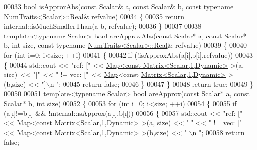 \begin{DoxyCode}
00033 \textcolor{keywordtype}{bool} isApproxAbs(\textcolor{keyword}{const} Scalar& a, \textcolor{keyword}{const} Scalar& b, \textcolor{keyword}{const} \textcolor{keyword}{typename} 
      \hyperlink{group___core___module_struct_eigen_1_1_num_traits}{NumTraits<Scalar>::Real}& refvalue)
00034 \{
00035   \textcolor{keywordflow}{return} internal::isMuchSmallerThan(a-b, refvalue);
00036 \}
00037 
00038 \textcolor{keyword}{template}<\textcolor{keyword}{typename} Scalar> \textcolor{keywordtype}{bool} areApproxAbs(\textcolor{keyword}{const} Scalar* a, \textcolor{keyword}{const} Scalar* b, \textcolor{keywordtype}{int} size, \textcolor{keyword}{const} \textcolor{keyword}{typename} 
      \hyperlink{group___core___module_struct_eigen_1_1_num_traits}{NumTraits<Scalar>::Real}& refvalue)
00039 \{
00040   \textcolor{keywordflow}{for} (\textcolor{keywordtype}{int} i=0; i<size; ++i)
00041   \{
00042     \textcolor{keywordflow}{if} (!isApproxAbs(a[i],b[i],refvalue))
00043     \{
00044       std::cout << \textcolor{stringliteral}{"ref: ["} << \hyperlink{group___core___module_class_eigen_1_1_map}{Map<const Matrix<Scalar,1,Dynamic>} >(a,
      size) << \textcolor{stringliteral}{"]"} << \textcolor{stringliteral}{" != vec: ["} << \hyperlink{group___core___module_class_eigen_1_1_map}{Map}<\textcolor{keyword}{const} \hyperlink{group___core___module_class_eigen_1_1_matrix}{Matrix<Scalar,1,Dynamic>} >(b,size) << \textcolor{stringliteral}{"]\(\backslash\)n
      "};
00045       \textcolor{keywordflow}{return} \textcolor{keyword}{false};
00046     \}
00047   \}
00048   \textcolor{keywordflow}{return} \textcolor{keyword}{true};
00049 \}
00050 
00051 \textcolor{keyword}{template}<\textcolor{keyword}{typename} Scalar> \textcolor{keywordtype}{bool} areApprox(\textcolor{keyword}{const} Scalar* a, \textcolor{keyword}{const} Scalar* b, \textcolor{keywordtype}{int} size)
00052 \{
00053   \textcolor{keywordflow}{for} (\textcolor{keywordtype}{int} i=0; i<size; ++i)
00054   \{
00055     \textcolor{keywordflow}{if} (a[i]!=b[i] && !internal::isApprox(a[i],b[i]))
00056     \{
00057       std::cout << \textcolor{stringliteral}{"ref: ["} << \hyperlink{group___core___module_class_eigen_1_1_map}{Map<const Matrix<Scalar,1,Dynamic>} >(a,
      size) << \textcolor{stringliteral}{"]"} << \textcolor{stringliteral}{" != vec: ["} << \hyperlink{group___core___module_class_eigen_1_1_map}{Map}<\textcolor{keyword}{const} \hyperlink{group___core___module_class_eigen_1_1_matrix}{Matrix<Scalar,1,Dynamic>} >(b,size) << \textcolor{stringliteral}{"]\(\backslash\)n
      "};
00058       \textcolor{keywordflow}{return} \textcolor{keyword}{false};

\end{DoxyCode}
